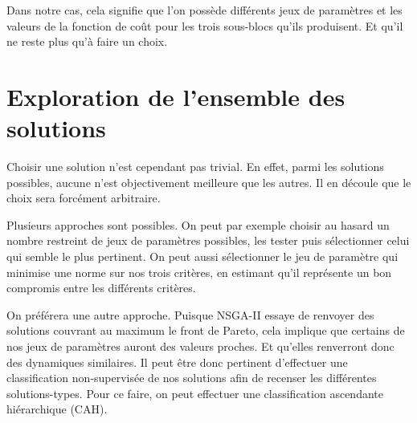 Dans notre cas, cela signifie que l'on possède différents jeux de paramètres et les valeurs de la fonction de coût pour les trois sous-blocs qu'ils produisent.
Et qu'il ne reste plus qu'à faire un choix.



\section{Exploration de l'ensemble des solutions}


Choisir une solution n'est cependant pas trivial.
En effet, parmi les solutions possibles, aucune n'est objectivement meilleure que les autres.
Il en découle que le choix sera forcément arbitraire.

Plusieurs approches sont possibles.
On peut par exemple choisir au hasard un nombre restreint de jeux de paramètres possibles, les tester puis sélectionner celui qui semble le plus pertinent.
On peut aussi sélectionner le jeu de paramètre qui minimise une norme sur nos trois critères, en estimant qu'il représente un bon compromis entre les différents critères.

On préférera une autre approche. 
Puisque NSGA-II essaye de renvoyer des solutions couvrant au maximum le front de Pareto, cela implique que certains de nos jeux de paramètres auront des valeurs proches.
Et qu'elles renverront donc des dynamiques similaires.
Il peut être donc pertinent d'effectuer une classification non-supervisée de nos solutions afin de recenser les différentes solutions-types.
Pour ce faire, on peut effectuer une classification ascendante hiérarchique (CAH).

